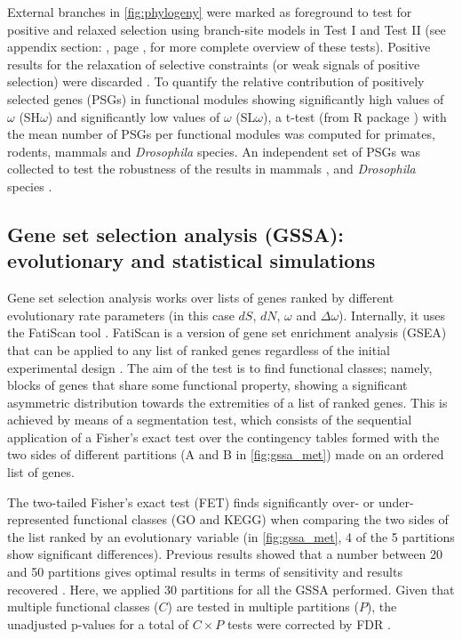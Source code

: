 External branches in \autoref{fig:phylogeny} were marked as foreground to test for positive and relaxed selection using branch-site models in Test I and Test II \cite{Zhang2005} (see appendix section: \textbf{}, page \pageref{sec:test-best-evol}, for more complete overview of these tests). Positive results for the relaxation of selective constraints (or weak signals of positive selection) were discarded \cite{Arbiza2006}. To quantify the relative contribution of positively selected genes (PSGs) in functional modules showing significantly high values of $\omega$ (SH$\omega$) and significantly low values of $\omega$ (SL$\omega$), a t-test (from R package \cite{Ihaka1996}) with the mean number of PSGs per functional modules was computed for primates, rodents, mammals and \textit{Drosophila} species. An independent set of PSGs was collected to test the robustness of the results in mammals \cite{Kosiol2008a}, and \textit{Drosophila} species \cite{Clark2007}.

\subsection{Gene set selection analysis (GSSA): evolutionary and statistical simulations}
\label{sec:gssa-evol-stat}

Gene set selection analysis works over lists of genes ranked by different evolutionary rate parameters (in this case $dS$, $dN$, $\omega$ and $\Delta\omega$). Internally, it uses the FatiScan tool \cite{Al-Shahrour2007}. FatiScan is a version of gene set enrichment analysis (GSEA) \cite{Al-Shahrour2005a} that can be applied to any list of ranked genes regardless of the initial experimental design \cite{Dopazo,Huang2009}. The aim of the test is to find functional classes; namely, blocks of genes that share some functional property, showing a significant asymmetric distribution towards the extremities of a list of ranked genes. This is achieved by means of a segmentation test, which consists of the sequential application of a Fisher's exact test over the contingency tables formed with the two sides of different partitions (A and B in \autoref{fig:gssa_met}) made on an ordered list of genes.

The two-tailed Fisher's exact test (FET) finds significantly over- or under- represented functional classes (GO and KEGG) when comparing the two sides of the list ranked by an evolutionary variable (in \autoref{fig:gssa_met}, 4 of the 5 partitions show significant differences). Previous results showed that a number between 20 and 50 partitions gives optimal results in terms of sensitivity and results recovered \cite{Al-Shahrour2005a}. Here, we applied 30 partitions for all the GSSA performed. Given that multiple functional classes ($C$) are tested in multiple partitions ($P$), the unadjusted p-values for a total of $C \times P$ tests were corrected by FDR \cite{Benjamini2001}. 

